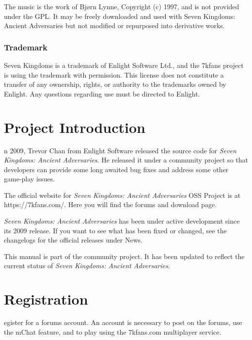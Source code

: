 \documentclass[openany]{book}
\begin{document}

The music is the work of Bjørn Lynne, Copyright (c) 1997, and is not provided under the GPL. It may be freely downloaded and used with Seven Kingdoms: Ancient Adversaries but not modified or repurposed into derivative works.

\subsubsection*{Trademark}

Seven Kingdoms is a trademark of Enlight Software Ltd., and the 7kfans project is using the trademark with permission. This license does not constitute a transfer of any ownership, rights, or authority to the trademarks owned by Enlight. Any questions regarding use must be directed to Enlight.

\clearpage

\section*{Project Introduction}


n 2009, Trevor Chan from Enlight Software released the source code for \textit{Seven Kingdoms: Ancient Adversaries}. He released it under a community project so that developers can provide some long awaited bug fixes and address some other game-play issues. 

The official website for \textit{Seven Kingdoms: Ancient Adversaries} OSS Project is at https://7kfans.com/. Here you will find the forums and download page.

\textit{Seven Kingdoms: Ancient Adversaries} has been under active development since its 2009 release. If you want to see what has been fixed or changed, see the changelogs for the official releases under News. 

This manual is part of the community project. It has been updated to reflect the current status of \textit{Seven Kingdoms: Ancient Adversaries}.


\section*{Registration}


egister for a forums account. An account is necessary to post on the forums, use the mChat feature, and to play using the 7kfans.com multiplayer service.
\end{document}
